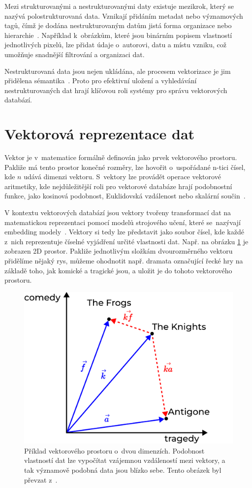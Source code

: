 Mezi strukturovanými a nestrukturovanými daty existuje mezikrok, který se nazývá polostrukturovaná data. Vznikají přidáním metadat nebo významových tagů, čímž je dodána nestrukturovaným datům jistá forma organizace nebo hierarchie~\cite{semi-structured}. Například k~obrázkům, které jsou binárním popisem vlastností jednotlivých pixelů, lze přidat údaje o~autorovi, datu a místu vzniku, což umožňuje snadnější filtrování a organizaci dat.

Nestrukturovaná data jsou nejen ukládána, ale procesem vektorizace je jim přidělena sémantika~\cite{Taipalus_2024}. Proto pro efektivní uložení a vyhledávání nestrukturovaných dat hrají klíčovou roli systémy pro správu vektorových databází.
 
\section{Vektorová reprezentace dat}
Vektor je v~matematice formálně definován jako prvek vektorového prostoru. Pakliže má tento prostor konečné rozměry, lze hovořit o~uspořádané n-tici čísel, kde $n$ udává dimenzi vektoru. S~vektory lze provádět operace vektorové aritmetiky, kde nejdůležitější roli pro vektorové databáze hrají podobnostní funkce, jako kosinová podobnost, Euklidovská vzdálenost nebo skalární součin~\cite{mathworld_vector}.

V kontextu vektorových databází jsou vektory tvořeny transformací dat na matematickou reprezentaci pomocí modelů strojového učení, které se~nazývají embedding modely~\cite{han2023_vector_database}. Vektory si tedy lze představit jako soubor čísel, kde každé z~nich reprezentuje číselné vyjádření určité vlastnosti dat. Např. na obrázku \ref{fig:vector2D} je zobrazen 2D prostor. Pakliže jednotlivým složkám dvourozměrného vektoru přidělíme nějaký rys, můžeme ohodnotit např. dramata označující řecké hry na základě toho, jak komické a tragické jsou, a uložit je do tohoto vektorového prostoru.

\begin{figure}[H]
    \centering
    \includegraphics[width=0.5\linewidth]{obrazky/vectors.pdf}
    \caption{Příklad vektorového prostoru o~dvou dimenzích. Podobnost vlastností dat lze vypočítat vzájemnou vzdáleností mezi vektory, a tak významově podobná data jsou blízko sebe. Tento obrázek byl převzat z~\cite{Taipalus_2024}.}
    \label{fig:vector2D}
\end{figure}

